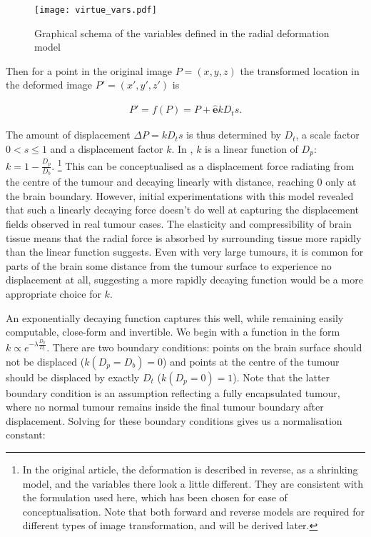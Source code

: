 \begin{figure}[htp]
  \centering
  \texttt{[image: virtue\_vars.pdf]}
  \caption{Graphical schema of the variables defined in the radial deformation model}
  \label{fig:virtue}
\end{figure}

Then for a point in the original image $P = (x,y,z)$ the transformed location in the deformed image $P' = (x',y',z')$ is

\begin{align}\label{eq:forwardP}
  P' = f(P) = P + \mathbf{\hat{e}}kD_ts.
\end{align}

The amount of displacement $\Delta P = kD_ts$ is thus determined by $D_t$, a scale factor $0<s \leq 1$ and a displacement factor $k$.
In \textcite{Nowinski2005}, $k$ is a linear function of $D_p$: $k = 1-\frac{D_p}{D_b}$. \footnote[2]{In the original \textcite{Nowinski2005} article, the deformation is described in reverse, as a shrinking model, and the variables there look a little different. They are consistent with the formulation used here, which has been chosen for ease of conceptualisation. Note that both forward and reverse models are required for different types of image transformation, and will be derived later.}
This can be conceptualised as a displacement force radiating from the centre of the tumour and decaying linearly with distance, reaching 0 only at the brain boundary.
However, initial experimentations with this model revealed that such a linearly decaying force doesn't do well at capturing the displacement fields observed in real tumour cases.
The elasticity and compressibility of brain tissue means that the radial force is absorbed by surrounding tissue more rapidly than the linear function suggests.
Even with very large tumours, it is common for parts of the brain some distance from the tumour surface to experience no displacement at all, suggesting a  more rapidly decaying function would be a more appropriate choice for $k$.

An exponentially decaying function captures this well, while remaining easily computable, close-form and invertible.
We begin with a function in the form $k \propto e^{-\lambda \frac{D_p}{D_t}}$.
There are two boundary conditions: points on the brain surface should not be displaced ($k(D_p = D_b) = 0$) and points at the centre of the tumour should be displaced by exactly $D_t$ ($k(D_p = 0) = 1$).
Note that the latter boundary condition is an assumption reflecting a fully encapsulated tumour, where no normal tumour remains inside the final tumour boundary after displacement.
Solving for these boundary conditions gives us a normalisation constant:

